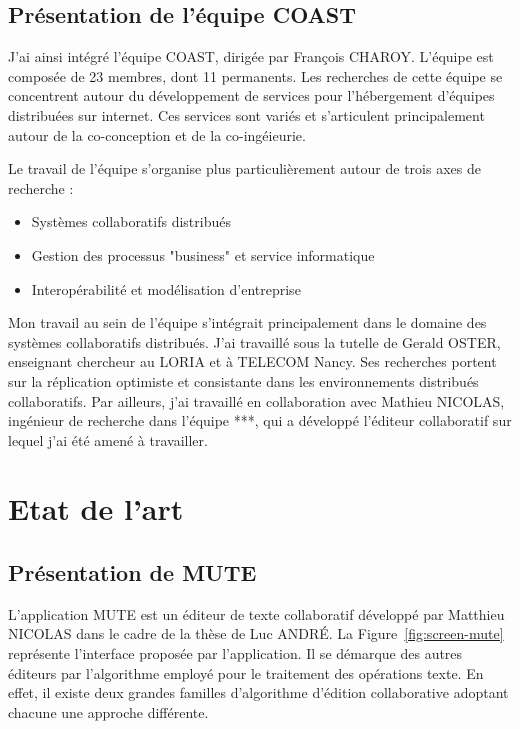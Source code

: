 \documentclass{tnreport}
\begin{document}
\section{Présentation de l'équipe COAST} 

J'ai ainsi intégré l'équipe COAST, dirigée par François CHAROY. L'équipe est composée de 23 membres, dont 11 permanents. Les recherches de cette équipe se concentrent autour du développement de services pour l'hébergement d'équipes distribuées sur internet. Ces services sont variés et s'articulent principalement autour de la co-conception et de la co-ingéieurie.

Le travail de l'équipe s'organise plus particulièrement autour de trois axes de recherche :

\begin{itemize}
  \item Systèmes collaboratifs distribués
  \item Gestion des processus "business" et service informatique
  \item Interopérabilité et modélisation d'entreprise
\end{itemize}

Mon travail au sein de l'équipe s'intégrait principalement dans le domaine des systèmes collaboratifs distribués. J'ai travaillé sous la tutelle de Gerald OSTER, enseignant chercheur au LORIA et à TELECOM Nancy. Ses recherches portent sur la réplication optimiste et consistante dans les environnements distribués collaboratifs. Par ailleurs, j'ai travaillé en collaboration avec Mathieu NICOLAS, ingénieur de recherche dans l'équipe ***, qui a développé l'éditeur collaboratif sur lequel j'ai été amené à travailler.  

\cleardoublepage


\chapter{Etat de l'art}

\section{Présentation de MUTE}

L'application MUTE est un éditeur de texte collaboratif développé par Matthieu NICOLAS dans le cadre de la thèse de Luc ANDRÉ. La Figure~\ref{fig:screen-mute} représente l'interface proposée par l'application. Il se démarque des autres éditeurs par l'algorithme employé pour le traitement des opérations texte. En effet, il existe deux grandes familles d'algorithme d'édition collaborative adoptant chacune une approche différente. 
\end{document}
